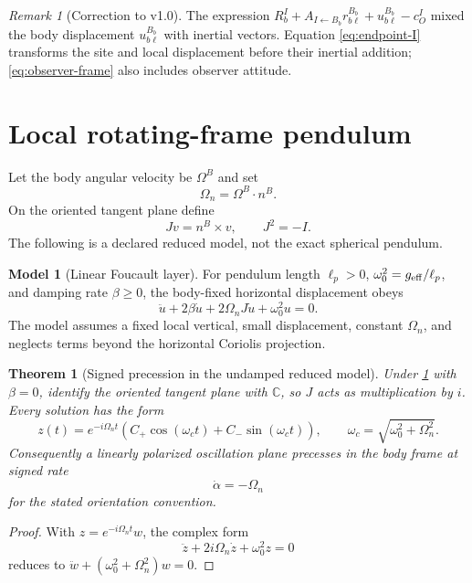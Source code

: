 \documentclass[11pt,a4paper]{article}
\theoremstyle{definition}
\newtheorem{model}[definition]{Model}
\theoremstyle{plain}
\newtheorem{theorem}[definition]{Theorem}
\theoremstyle{remark}
\newtheorem{remark}[definition]{Remark}
\begin{document}
\begin{remark}[Correction to v1.0]
The expression
\(R_b^I+A_{I\leftarrow B_b}r_{b\ell}^{B_b}+u_{b\ell}^{B_b}-c_O^I\)
mixed the body displacement \(u_{b\ell}^{B_b}\) with inertial
vectors. Equation \cref{eq:endpoint-I} transforms the site and local
displacement before their inertial addition; \cref{eq:observer-frame}
also includes observer attitude.
\end{remark}

\section{Local rotating-frame pendulum}

Let the body angular velocity be \(\Omega^B\) and set
\[
\Omega_n=\Omega^B\cdot n^B .
\]
On the oriented tangent plane define
\[
Jv=n^B\times v,\qquad J^2=-I .
\]
The following is a declared reduced model, not the exact spherical
pendulum.

\begin{model}[Linear Foucault layer]\label{model:foucault}
For pendulum length \(\ell_p>0\),
\(\omega_0^2=g_{\rm eff}/\ell_p\), and damping rate
\(\beta\ge0\), the body-fixed horizontal displacement obeys
\begin{equation}\label{eq:local-foucault}
\ddot u+2\beta\dot u+2\Omega_nJ\dot u+\omega_0^2u=0.
\end{equation}
The model assumes a fixed local vertical, small displacement,
constant \(\Omega_n\), and neglects terms beyond the horizontal
Coriolis projection.
\end{model}

\begin{theorem}[Signed precession in the undamped reduced model]
\label{thm:precession}
Under \cref{model:foucault} with \(\beta=0\), identify the oriented
tangent plane with \(\mathbb C\), so \(J\) acts as multiplication by
\(i\). Every solution has the form
\[
z(t)=e^{-i\Omega_nt}
\left(C_+\cos(\omega_ct)+C_-\sin(\omega_ct)\right),
\qquad
\omega_c=\sqrt{\omega_0^2+\Omega_n^2}.
\]
Consequently a linearly polarized oscillation plane precesses in the
body frame at signed rate
\[
\boxed{\dot\alpha=-\Omega_n}
\]
for the stated orientation convention.
\end{theorem}

\begin{proof}
With \(z=e^{-i\Omega_nt}w\), the complex form
\[
\ddot z+2i\Omega_n\dot z+\omega_0^2z=0
\]
reduces to
\(\ddot w+(\omega_0^2+\Omega_n^2)w=0\).
\end{proof}
\end{document}
